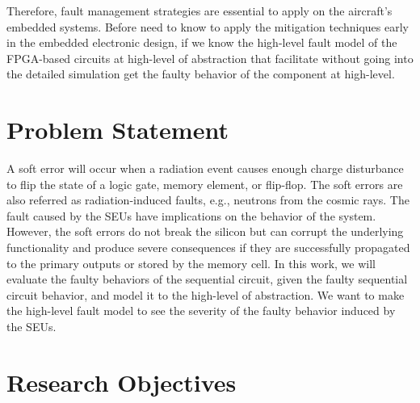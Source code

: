 %

Therefore, fault management strategies are essential to apply on the aircraft's embedded systems. Before need to know to apply the mitigation techniques early in the embedded electronic design, if we know the high-level fault model of the FPGA-based circuits at high-level of abstraction that facilitate without going into the detailed simulation get the faulty behavior of the component at high-level.

  

\section{Problem Statement}

A soft error will occur when a radiation event causes enough charge disturbance to flip the state of a logic gate, memory element, or flip-flop. The soft errors are also referred as radiation-induced faults, e.g., neutrons from the cosmic rays. The fault caused by the SEUs have implications on the behavior of the system. However, the soft errors do not break the silicon but can corrupt the underlying functionality and produce severe consequences if they are successfully propagated to the primary outputs or stored by the memory cell. In this work, we will evaluate the faulty behaviors of the sequential circuit, given the faulty sequential circuit behavior, and model it to the high-level of abstraction. We want to make the high-level fault model to see the severity of the faulty behavior induced by the SEUs.







\section{Research Objectives}



